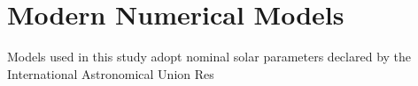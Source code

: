 \section{Modern Numerical Models}
Models used in this study adopt nominal solar parameters declared by the International Astronomical Union Res